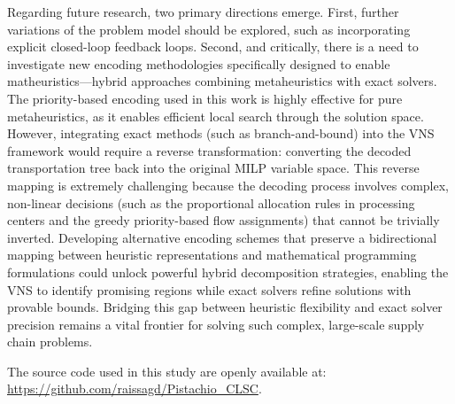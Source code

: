 \documentclass[preprint,12pt,authoryear]{elsarticle}
\begin{document}
Regarding future research, two primary directions emerge. First, further variations of the problem model should be explored, such as incorporating explicit closed-loop feedback loops. 
Second, and critically, there is a need to investigate new encoding methodologies specifically designed to enable 
matheuristics—hybrid approaches combining metaheuristics with exact solvers. The priority-based encoding used in this work is highly effective for pure metaheuristics, as it enables 
efficient local search through the solution space. However, integrating exact methods (such as branch-and-bound) into the VNS framework would require a reverse transformation: 
converting the decoded transportation tree back into the original MILP variable space. This reverse mapping is extremely challenging because the decoding process involves complex, non-linear 
decisions (such as the proportional allocation rules in processing centers and the greedy priority-based flow assignments) that cannot be trivially inverted. Developing alternative encoding 
schemes that preserve a bidirectional mapping between heuristic representations and mathematical programming formulations could unlock powerful hybrid decomposition strategies, enabling 
the VNS to identify promising regions while exact solvers refine solutions with provable bounds. Bridging this gap between heuristic flexibility and exact solver precision remains a vital 
frontier for solving such complex, large-scale supply chain problems.

The source code used in this study are openly available at: \url{https://github.com/raissagd/Pistachio_CLSC}.


\end{document}
